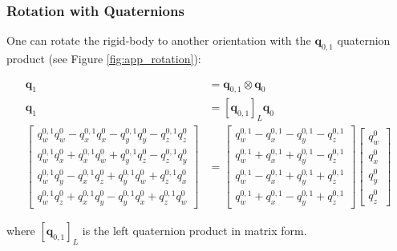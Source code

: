 \documentclass[a4paper]{report}
\numberwithin{figure}{section}
\begin{document}
\begin{appendices}
\subsubsection{Rotation with Quaternions}

One can rotate the rigid-body to another orientation with the 
$\mathbf{q}_{0,1}$ quaternion product (see Figure \ref{fig:app_rotation}):

\begin{equation}
\begin{aligned}
  \mathbf{q}_1 &= \mathbf{q}_{0,1} \otimes \mathbf{q}_0\\
  \mathbf{q}_1 &= [\mathbf{q}_{0,1}]_L \mathbf{q}_0\\
  \begin{bmatrix} 
    q_w^{0,1} q_w^0 - q_x^{0,1} q_x^0 - q_y^{0,1} q_y^0 - q_z^{0,1} q_z^0  \\ 
    q_w^{0,1} q_x^0 + q_x^{0,1} q_w^0 + q_y^{0,1} q_z^0 - q_z^{0,1} q_y^0  \\ 
    q_w^{0,1} q_y^0 - q_x^{0,1} q_z^0 + q_y^{0,1} q_w^0 + q_z^{0,1} q_x^0  \\ 
    q_w^{0,1} q_z^0 + q_x^{0,1} q_y^0 - q_y^{0,1} q_x^0 + q_z^{0,1} q_w^0  
  \end{bmatrix} & = 
  \begin{bmatrix} 
    q_w^{0,1} - q_x^{0,1} - q_y^{0,1} - q_z^{0,1}  \\ 
    q_w^{0,1} + q_x^{0,1} + q_y^{0,1} - q_z^{0,1}  \\ 
    q_w^{0,1} - q_x^{0,1} + q_y^{0,1} + q_z^{0,1}  \\ 
    q_w^{0,1} + q_x^{0,1} - q_y^{0,1} + q_z^{0,1}  
  \end{bmatrix}
  \begin{bmatrix} q_w^0 \\ q_x^0 \\ q_y^0 \\ q_z^0 \end{bmatrix}
\end{aligned}
\end{equation}

where $[\mathbf{q}_{0,1}]_L$ is the left quaternion product in matrix form.


\end{appendices}
\end{document}
